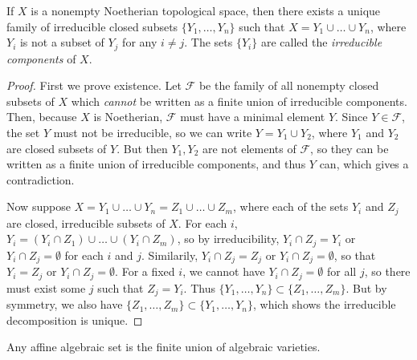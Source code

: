 \begin{lemma}
    If $X$ is a nonempty Noetherian topological space, then there exists a unique family of irreducible closed subsets $\{ Y_1,\dots, Y_n \}$ such that $X = Y_1 \cup \dots \cup Y_n$, where $Y_i$ is not a subset of $Y_j$ for any $i \neq j$. The sets $\{ Y_i \}$ are called the \emph{irreducible components} of $X$.
\end{lemma}
\begin{proof}
    First we prove existence. Let $\mathcal{F}$ be the family of all nonempty closed subsets of $X$ which \emph{cannot} be written as a finite union of irreducible components. Then, because $X$ is Noetherian, $\mathcal{F}$ must have a minimal element $Y$. Since $Y \in \mathcal{F}$, the set $Y$ must not be irreducible, so we can write $Y = Y_1 \cup Y_2$, where $Y_1$ and $Y_2$ are closed subsets of $Y$. But then $Y_1,Y_2$ are not elements of $\mathcal{F}$, so they can be written as a finite union of irreducible components, and thus $Y$ can, which gives a contradiction.

    Now suppose $X = Y_1 \cup \dots \cup Y_n = Z_1 \cup \dots \cup Z_m$, where each of the sets $Y_i$ and $Z_j$ are closed, irreducible subsets of $X$. For each $i$, $Y_i = (Y_i \cap Z_1) \cup \dots \cup (Y_i \cap Z_m)$, so by irreducibility, $Y_i \cap Z_j = Y_i$ or $Y_i \cap Z_j = \emptyset$ for each $i$ and $j$. Similarily, $Y_i \cap Z_j = Z_j$ or $Y_i \cap Z_j = \emptyset$, so that $Y_i = Z_j$ or $Y_i \cap Z_j = \emptyset$. For a fixed $i$, we cannot have $Y_i \cap Z_j = \emptyset$ for all $j$, so there must exist some $j$ such that $Z_j = Y_i$. Thus $\{ Y_1,\dots,Y_n \} \subset \{ Z_1, \dots, Z_m \}$. But by symmetry, we also have $\{ Z_1,\dots,Z_m \} \subset \{ Y_1,\dots,Y_n \}$, which shows the irreducible decomposition is unique.
\end{proof}

\begin{corollary}
    Any affine algebraic set is the finite union of algebraic varieties.
\end{corollary}


